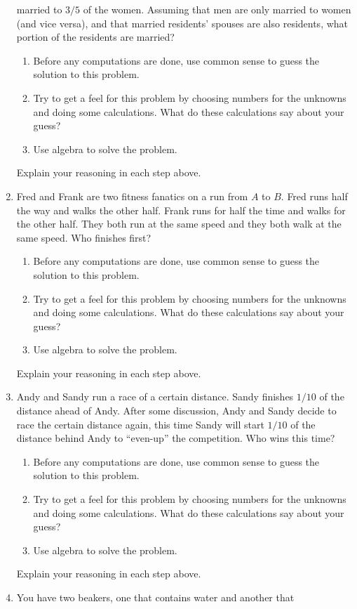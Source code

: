 \begin{problems}
\begin{enumerate}
  married to $3/5$ of the women. Assuming that men are only married to
  women (and vice versa), and that married residents' spouses are also
  residents, what portion of the residents are married? 
\begin{enumerate}
\item Before any computations are done, use common sense to guess the
  solution to this problem.
\item Try to get a feel for this problem by choosing numbers for the
  unknowns and doing some calculations. What do these calculations say
  about your guess?
\item Use algebra to solve the problem.
\end{enumerate}
Explain your reasoning in each step above.
\item Fred and Frank are two fitness fanatics on a run from $A$ to
  $B$. Fred runs half the way and walks the other half. Frank runs for
  half the time and walks for the other half. They both run at the
  same speed and they both walk at the same speed. Who finishes first?
\begin{enumerate}
\item Before any computations are done, use common sense to guess the
  solution to this problem.
\item Try to get a feel for this problem by choosing numbers for the
  unknowns and doing some calculations. What do these calculations say
  about your guess?
\item Use algebra to solve the problem.
\end{enumerate}
Explain your reasoning in each step above.
\item Andy and Sandy run a race of a certain distance. Sandy finishes
  $1/10$ of the distance ahead of Andy. After some discussion, Andy
  and Sandy decide to race the certain distance again, this time Sandy
  will start $1/10$ of the distance behind Andy to ``even-up'' the
  competition. Who wins this time?
\begin{enumerate}
\item Before any computations are done, use common sense to guess the
  solution to this problem.
\item Try to get a feel for this problem by choosing numbers for the
  unknowns and doing some calculations. What do these calculations say
  about your guess?
\item Use algebra to solve the problem.
\end{enumerate}
Explain your reasoning in each step above.
\item You have two beakers, one that contains water and another that

\end{enumerate}
\end{problems}
